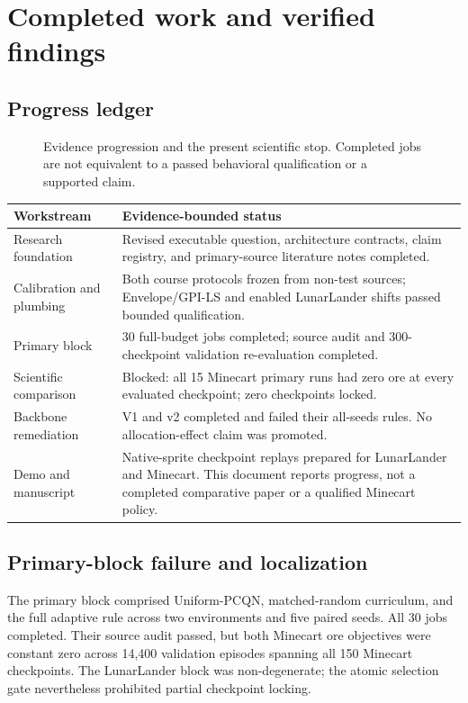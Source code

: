 \section{Completed work and verified findings}

\subsection{Progress ledger}
\begin{figure}[htbp]
\centering

\caption{Evidence progression and the present scientific stop. Completed jobs
are not equivalent to a passed behavioral qualification or a supported claim.}
\end{figure}
\begin{tabularx}{\textwidth}{@{}p{39mm}Y@{}}
\toprule
\textbf{Workstream} & \textbf{Evidence-bounded status} \\
\midrule
Research foundation & Revised executable question, architecture contracts,
claim registry, and primary-source literature notes completed. \\
Calibration and plumbing & Both course protocols frozen from non-test
sources; Envelope/GPI-LS and enabled LunarLander shifts passed bounded qualification. \\
Primary block & 30 full-budget jobs completed; source audit and
300-checkpoint validation re-evaluation completed. \\
Scientific comparison & Blocked: all 15 Minecart primary runs had zero ore
at every evaluated checkpoint; zero checkpoints locked. \\
Backbone remediation & V1 and v2 completed and failed their all-seeds rules.
No allocation-effect claim was promoted. \\
Demo and manuscript & Native-sprite checkpoint replays prepared for LunarLander
and Minecart. This document reports progress, not a completed comparative paper
or a qualified Minecart policy. \\
\bottomrule
\end{tabularx}

\subsection{Primary-block failure and localization}
The primary block comprised Uniform-PCQN, matched-random curriculum, and the
full adaptive rule across two environments and five paired seeds. All 30 jobs
completed. Their source audit passed, but both Minecart ore objectives were
constant zero across 14,400 validation episodes spanning all 150 Minecart
checkpoints. The LunarLander block was non-degenerate; the atomic selection
gate nevertheless prohibited partial checkpoint locking.


